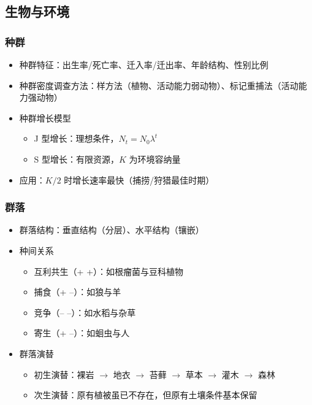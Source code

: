 \subsection{生物与环境}

\subsubsection{种群}

\begin{itemize}
  \item 种群特征：出生率/死亡率、迁入率/迁出率、年龄结构、性别比例
  \item 种群密度调查方法：样方法（植物、活动能力弱动物）、标记重捕法（活动能力强动物）
  \item 种群增长模型
  \begin{itemize}
    \item J 型增长：理想条件，$N_t=N_0\lambda^t$
    \item S 型增长：有限资源，$K$ 为环境容纳量
  \end{itemize}
  \item 应用：$K/2$ 时增长速率最快（捕捞/狩猎最佳时期）
\end{itemize}

\subsubsection{群落}

\begin{itemize}
  \item 群落结构：垂直结构（分层）、水平结构（镶嵌）
  \item 种间关系
  \begin{itemize}
    \item 互利共生（+ +）：如根瘤菌与豆科植物
    \item 捕食（+ --）：如狼与羊
    \item 竞争（-- --）：如水稻与杂草
    \item 寄生（+ --）：如蛔虫与人
  \end{itemize}
  \item 群落演替
  \begin{itemize}
    \item 初生演替：裸岩 $\to$ 地衣 $\to$ 苔藓 $\to$ 草本 $\to$ 灌木 $\to$ 森林
    \item 次生演替：原有植被虽已不存在，但原有土壤条件基本保留
  \end{itemize}
\end{itemize}

